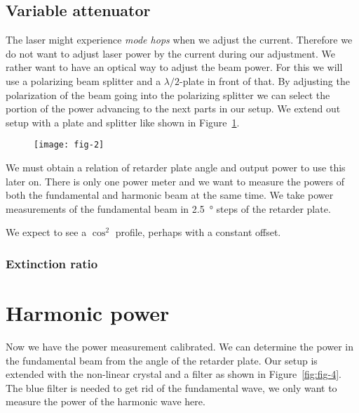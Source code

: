 \documentclass[11pt, english, fleqn, DIV=15, headinclude, BCOR=2cm]{scrreprt}
\begin{document}

\subsection{Variable attenuator}
\label{sec:variable_attenuator}

The laser might experience \emph{mode hops} when we adjust the current.
Therefore we do not want to adjust laser power by the current during our
adjustment. We rather want to have an optical way to adjust the beam power. For
this we will use a polarizing beam splitter and a $\lambda/2$-plate in front of
that. By adjusting the polarization of the beam going into the polarizing
splitter we can select the portion of the power advancing to the next parts in
our setup. We extend out setup with a plate and splitter like shown in
Figure~\ref{fig:fig-2}.

\begin{figure}
    \centering
    \texttt{[image: fig-2]}
    \caption{%
        \parencite[Figure~2]{lab-course/doubling/manual}
    }
    \label{fig:fig-2}
\end{figure}

We must obtain a relation of retarder plate angle and output power to use this
later on. There is only one power meter and we want to measure the powers of
both the fundamental and harmonic beam at the same time. We take power
measurements of the fundamental beam in \SI{2.5}{\degree} steps of the retarder
plate.


We expect to see a $\cos^2$ profile, perhaps with a constant offset.


\subsubsection{Extinction ratio}


\section{Harmonic power}

Now we have the power measurement calibrated. We can determine the power in the
fundamental beam from the angle of the retarder plate. Our setup is extended
with the non-linear crystal and a filter as shown in Figure~\ref{fig:fig-4}.
The blue filter is needed to get rid of the fundamental wave, we only want to
measure the power of the harmonic wave here.
\end{document}

